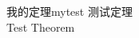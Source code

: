 \documentclass[cn]{../../templates/elegantbook/elegantbook}
\begin{document}
\begin{theorem}{我的定理}{mytest}
测试定理 \\
Test Theorem
\end{theorem}
\end{document}
